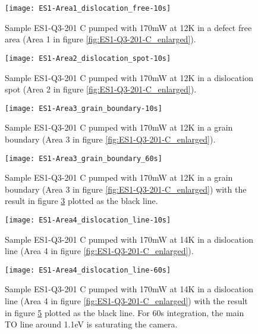 \begin{figure}[H]
\centering
\texttt{[image: ES1-Area1\_dislocation\_free-10s]}
\caption[ES1-Q3-201 at a defect free area]{Sample ES1-Q3-201 C pumped with 170mW at 12K in a defect free area (Area 1 in figure \ref{fig:ES1-Q3-201-C_enlarged}).}
\label{fig:ES1-Area1_dislocation_free-10s}%
\end{figure}

\begin{figure}[H]
\centering
\texttt{[image: ES1-Area2\_dislocation\_spot-10s]}
\caption[ES1-Q3-201 at a defect free area]{Sample ES1-Q3-201 C pumped with 170mW at 12K in a dislocation spot (Area 2 in figure \ref{fig:ES1-Q3-201-C_enlarged}).}
\label{fig:ES1-Area2_dislocation_spot-10s}%
\end{figure}


\begin{figure}[H]
\centering
\texttt{[image: ES1-Area3\_grain\_boundary-10s]}
\caption[ES1-Q3-201 at a grain boundary]{Sample ES1-Q3-201 C pumped with 170mW at 12K in a grain boundary (Area 3 in figure \ref{fig:ES1-Q3-201-C_enlarged}).}
\label{fig:ES1-Area3_grain_boundary-10s}%
\end{figure}

\begin{figure}[H]
\centering
\texttt{[image: ES1-Area3\_grain\_boundary\_60s]}
\caption[ES1-Q3-201 at a grain boundary]{Sample ES1-Q3-201 C pumped with 170mW at 12K in a grain boundary (Area 3 in figure \ref{fig:ES1-Q3-201-C_enlarged}) with the result in figure \ref{fig:ES1-Area3_grain_boundary-10s} plotted as the black line.}
\label{fig:ES1-Area3_grain_boundary_60s}%
\end{figure}


\begin{figure}[H]
\centering
\texttt{[image: ES1-Area4\_dislocation\_line-10s]}
\caption[ES1-Q3-201 at a dislocation line]{Sample ES1-Q3-201 C pumped with 170mW at 14K in a dislocation line (Area 4 in figure \ref{fig:ES1-Q3-201-C_enlarged}).}
\label{fig:ES1-Area4_dislocation_line-10s}%
\end{figure}

\begin{figure}[H]
\centering
\texttt{[image: ES1-Area4\_dislocation\_line-60s]}
\caption[ES1-Q3-201 at a dislocation line]{Sample ES1-Q3-201 C pumped with 170mW at 14K in a dislocation line (Area 4 in figure \ref{fig:ES1-Q3-201-C_enlarged}) with the result in figure \ref{fig:ES1-Area4_dislocation_line-10s} plotted as the black line. For 60s integration, the main TO line around 1.1eV is saturating the camera.}
\label{fig:ES1-Area4_dislocation_line-60s}%
\end{figure}



